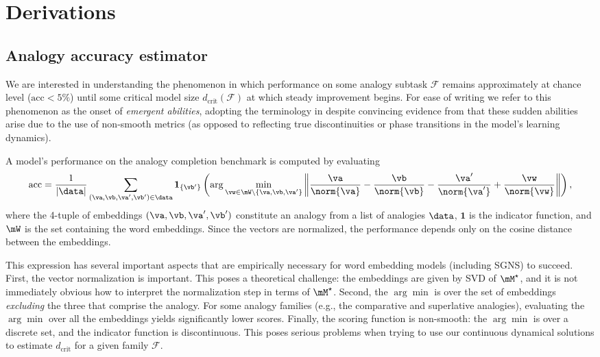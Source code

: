 \section{Derivations}
\label{appdx:derivations}

\subsection{Analogy accuracy estimator}

We are interested in understanding the phenomenon in which performance on some analogy subtask $\mathcal{F}$ remains approximately at chance level ($\mathrm{acc} < 5\%$) until some critical model size $d_\mathrm{crit}(\mathcal{F})$ at which steady improvement begins. For ease of writing we refer to this phenomenon as the onset of \textit{emergent abilities}, adopting the terminology in \cite{wei2022emergent} despite convincing evidence from \cite{schaeffer2024emergent} that these sudden abilities arise due to the use of non-smooth metrics (as opposed to reflecting true discontinuities or phase transitions in the model's learning dynamics).

A model's performance on the analogy completion benchmark is computed by evaluating
\begin{equation}
    \mathrm{acc} = \frac{1}{|\data|}\sum_{(\va,\vb,\va',\vb')\in\data}
    \mathbf{1}_{\{\vb'\}} \left(\arg\min_{\vw\in\mW\setminus\{\va,\vb,\va'\}} \left\lVert \frac{\va}{\norm{\va}} - \frac{\vb}{\norm{\vb}} - \frac{\va'}{\norm{\va'}} + \frac{\vw}{\norm{\vw}}\right\rVert\right),
\end{equation}
where the 4-tuple of embeddings $(\va,\vb,\va',\vb')$ constitute an analogy from a list of analogies $\data$, $\mathbf{1}$ is the indicator function, and $\mW$ is the set containing the word embeddings. Since the vectors are normalized, the performance depends only on the cosine distance between the embeddings.

This expression has several important aspects that are empirically necessary for word embedding models (including SGNS) to succeed. First, the vector normalization is important. This poses a theoretical challenge: the embeddings are given by SVD of $\Mstar$, and it is not immediately obvious how to interpret the normalization step in terms of $\Mstar$. Second, the $\arg\min$ is over the set of embeddings \textit{excluding} the three that comprise the analogy. For some analogy families (e.g., the comparative and superlative analogies), evaluating the $\arg\min$ over all the embeddings yields significantly lower scores. Finally, the scoring function is non-smooth: the $\arg\min$ is over a discrete set, and the indicator function is discontinuous. This poses serious problems when trying to use our continuous dynamical solutions to estimate $d_\mathrm{crit}$ for a given family $\mathcal{F}$.


